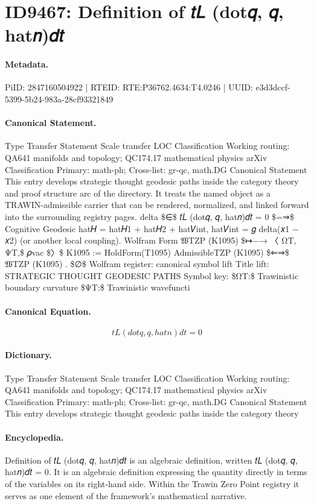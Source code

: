 \section*{ID9467: Definition of 𝑡𝐿 (dot𝑞, 𝑞, hat𝑛)𝑑𝑡}
\paragraph{Metadata.}
PiID: 2847160504922 | RTEID: RTE:P36762.4634:T4.0246 | UUID: e3d3dccf-5399-5b24-983a-28cf93321849

\paragraph{Canonical Statement.}
Type Transfer Statement Scale transfer LOC Classification Working routing: QA641 manifolds and topology; QC174.17 mathematical physics arXiv Classification Primary: math-ph; Cross-list: gr-qc, math.DG Canonical Statement This entry develops strategic thought geodesic paths inside the category theory and proof structure arc of the directory. It treats the named object as a TRAWIN-admissible carrier that can be rendered, normalized, and linked forward into the surrounding registry pages. delta \$∈\$ 𝑡𝐿 (dot𝑞, 𝑞, hat𝑛)𝑑𝑡 = 0 \$=⇒\$ Cognitive Geodesic hat𝐻 = hat𝐻1 + hat𝐻2 + hat𝑉int, hat𝑉int = 𝑔 delta(𝑥1 − 𝑥2) (or another local coupling). Wolfram Form 𝔚TZP (K1095) \$↦−→ 〈 ΩT, ΨT,\$ 𝜌vac \$〉\$ K1095 := HoldForm(T1095) AdmissibleTZP (K1095) \$⇐⇒\$ 𝔚TZP (K1095) . \$∅\$ Wolfram register: canonical symbol lift Title lift: STRATEGIC THOUGHT GEODESIC PATHS Symbol key: \$ΩT:\$ Trawinistic boundary curvature \$ΨT:\$ Trawinistic wavefuncti

\paragraph{Canonical Equation.}
\[
𝑡𝐿 (dot𝑞, 𝑞, hat𝑛)𝑑𝑡 = 0
\]

\paragraph{Dictionary.}
Type Transfer Statement Scale transfer LOC Classification Working routing: QA641 manifolds and topology; QC174.17 mathematical physics arXiv Classification Primary: math-ph; Cross-list: gr-qc, math.DG Canonical Statement This entry develops strategic thought geodesic paths inside the category theory

\paragraph{Encyclopedia.}
Definition of 𝑡𝐿 (dot𝑞, 𝑞, hat𝑛)𝑑𝑡 is an algebraic definition, written 𝑡𝐿 (dot𝑞, 𝑞, hat𝑛)𝑑𝑡 = 0. It is an algebraic definition expressing the quantity directly in terms of the variables on its right-hand side. Within the Trawin Zero Point registry it serves as one element of the framework's mathematical narrative.

